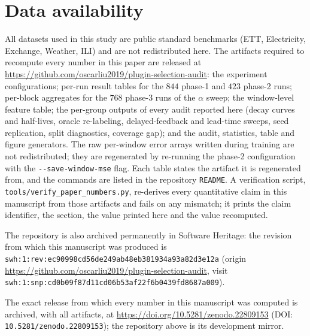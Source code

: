 \documentclass[a4paper,fleqn]{cas-sc}
\begin{document}
\section*{Data availability}
All datasets used in this study are public standard benchmarks (ETT, Electricity,
Exchange, Weather, ILI) and are not redistributed here. The artifacts required to
recompute every number in this paper are released at
\url{https://github.com/oscarliu2019/plugin-selection-audit}: the experiment
configurations; per-run result tables for the $844$ phase-1 and $423$ phase-2
runs; per-block aggregates for the $768$ phase-3 runs of the $\alpha$ sweep; the
window-level feature table; the per-group outputs of every audit reported here
(decay curves and half-lives, oracle re-labeling, delayed-feedback and lead-time
sweeps, seed replication, split diagnostics, coverage gap); and the audit,
statistics, table and figure generators. The raw per-window error arrays written
during training are not redistributed; they are regenerated by re-running the
phase-2 configuration with the \texttt{-{}-save-window-mse} flag. Each table
states the artifact it is regenerated from, and the commands are listed in the
repository \texttt{README}. A verification script,
\texttt{tools/verify\_paper\_numbers.py}, re-derives every quantitative claim in
this manuscript from those artifacts and fails on any mismatch; it prints the
claim identifier, the section, the value printed here and the value recomputed.

\begin{sloppypar}
The repository is also archived permanently in Software Heritage: the revision
from which this manuscript was produced is
\texttt{swh:1:rev:ec90998cd56de249ab48eb381934a93a82d3e12a} (origin
\url{https://github.com/oscarliu2019/plugin-selection-audit}, visit \texttt{swh:1:snp:cd0b09f87d11cd06b53af22f6b0439fd8687a009}).
\end{sloppypar}


The exact release from which every number in this manuscript was computed is
archived, with all artifacts, at \url{https://doi.org/10.5281/zenodo.22809153} (DOI: \texttt{10.5281/zenodo.22809153}); the
repository above is its development mirror.



\end{document}
